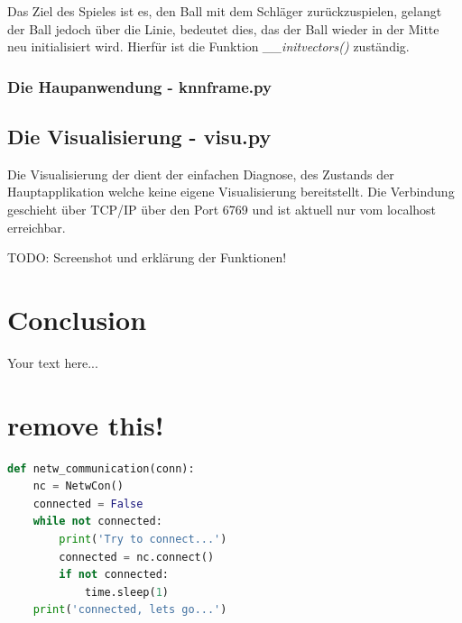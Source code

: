 \documentclass[12pt,twoside]{article}
\theoremstyle{plain}
\theoremstyle{definition}
\theoremstyle{remark}
\begin{document}
Das Ziel des Spieles ist es, den Ball mit dem Schläger zurückzuspielen, gelangt der Ball jedoch über die Linie, bedeutet dies, das der Ball wieder in der Mitte neu initialisiert wird. Hierfür ist die Funktion \textit{\_\_initvectors()} zuständig.


\subsubsection{Die Haupanwendung - knnframe.py}
\label{knnframe.py}


\subsection{Die Visualisierung - visu.py}
\label{visu.py}

Die Visualisierung der dient der einfachen Diagnose, des Zustands der Hauptapplikation welche keine eigene Visualisierung bereitstellt. Die Verbindung geschieht über TCP/IP über den Port 6769 und ist aktuell nur vom localhost erreichbar.

TODO: Screenshot und erklärung der Funktionen! 




\section{Conclusion}


Your text here...





\section{remove this!}
\label{sec:concl}

\begin{lstlisting}[frame=single,language=Python]  % Start your code-block
def netw_communication(conn):
    nc = NetwCon()
    connected = False
    while not connected:
        print('Try to connect...')
        connected = nc.connect()
        if not connected:
            time.sleep(1)
    print('connected, lets go...')
\end{lstlisting}
\end{document}
